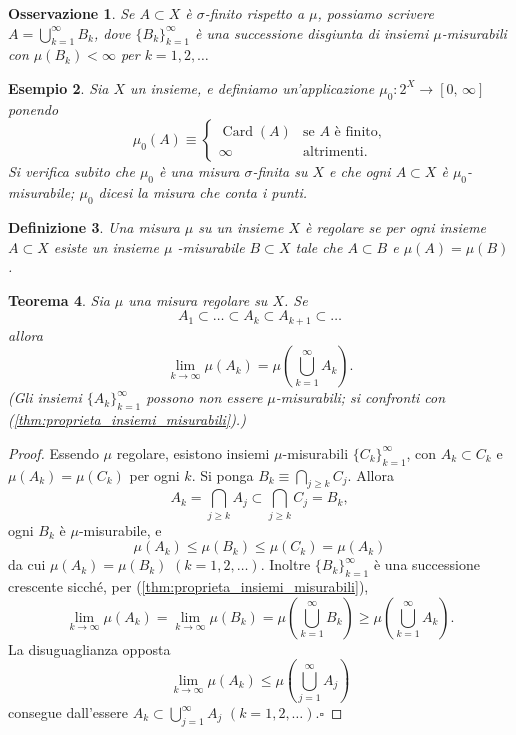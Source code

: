 \documentclass[a4paper,10pt,openright,oneside]{book}
\theoremstyle{theoremstyle}
\newtheorem{teorema}{Teorema}[section]
\theoremstyle{theoremstylewoheader}
\theoremstyle{theoremstyle}
\newtheorem{definizione}[teorema]{Definizione}
\newtheorem{esempio}[teorema]{Esempio}
\newtheorem{osservazione}[teorema]{Osservazione}
\theoremstyle{proofsecstyle}
\theoremstyle{nonumberplain}
\newtheorem{proof}{Dim.}
\DeclareMathOperator{\Card}{Card}
\renewcommand{\qedsymbol}{\ensuremath{\square}}
\newcommand{\qed}{\unskip\nobreak\hfill\nobreak\hspace{.5em}\qedsymbol}
\begin{document}
\begin{osservazione}
Se $A \subset X$ è $\sigma$-finito rispetto a $\mu$, possiamo scrivere $A = \bigcup_{k=1}^\infty B_k$, dove $\{B_k\}_{k=1}^\infty$ è una successione \emph{disgiunta} di insiemi $\mu$-misurabili con $\mu(B_k) < \infty$ per $k = 1, 2, \ldots$
\end{osservazione}

\begin{esempio}
\label{ex:misura_che_conta}
Sia $X$ un insieme, e definiamo un'applicazione $\mu_0 : 2^X \rightarrow [0,\, \infty]$ ponendo
\[
\mu_0(A) \equiv \begin{cases}
\Card(A) & \text{se $A$ è finito,}\\
\infty & \text{altrimenti.}
\end{cases}
\]
Si verifica subito che $\mu_0$ è una misura $\sigma$-finita su $X$ e che ogni $A \subset X$ è $\mu_0$-misurabile; $\mu_0$ dicesi la \emph{misura che conta i punti}.
\end{esempio}

\begin{definizione}
\label{def:misure_regolari}
Una misura $\mu$ su un insieme $X$ è \emph{regolare} se per ogni insieme $A \subset X$ esiste un insieme $\mu$ -misurabile $B \subset X$ tale che $A \subset B$ e $\mu(A) = \mu(B)$.
\end{definizione}

\begin{teorema}
\label{thm:proprieta_misure_regolari}
Sia $\mu$ una misura regolare su $X$. Se
\[
A_1 \subset \ldots \subset A_k \subset A_{k+1} \subset \ldots
\]
allora
\[
\lim_{k \to \infty} \mu(A_k) = \mu\left(\bigcup_{k=1}^\infty A_k\right).
\]
(Gli insiemi $\{A_k\}_{k=1}^\infty$ possono non essere $\mu$-misurabili; si confronti con (\ref{thm:proprieta_insiemi_misurabili}).)
\end{teorema}

\begin{proof}
Essendo $\mu$ regolare, esistono insiemi $\mu$-misurabili $\{C_k\}_{k=1}^\infty$, con $A_k \subset C_k$ e $\mu(A_k) = \mu(C_k)$ per ogni $k$. Si ponga $B_k \equiv \bigcap_{j \ge k} C_j$. Allora
\[
A_k = \bigcap_{j \ge k} A_j \subset \bigcap_{j \ge k} C_j = B_k,
\]
ogni $B_k$ è $\mu$-misurabile, e
\[
\mu(A_k) \le \mu(B_k) \le \mu(C_k) = \mu(A_k)
\]
da cui $\mu(A_k) = \mu(B_k)$ $(k = 1, 2, \ldots)$. Inoltre $\{B_k\}_{k=1}^\infty$ è una successione crescente sicché, per (\ref{thm:proprieta_insiemi_misurabili}), 
\[
\lim_{k \to \infty} \mu(A_k) = \lim_{k \to \infty} \mu(B_k) = \mu\left(\bigcup_{k=1}^\infty B_k\right) \ge \mu\left(\bigcup_{k=1}^\infty A_k\right).
\]
La disuguaglianza opposta
\[
\lim_{k \to \infty} \mu(A_k) \le \mu\left(\bigcup_{j=1}^\infty A_j\right)
\]
consegue dall'essere $A_k \subset \bigcup_{j=1}^\infty A_j$ $(k = 1, 2, \ldots)$.\qed
\end{proof}
\end{document}

